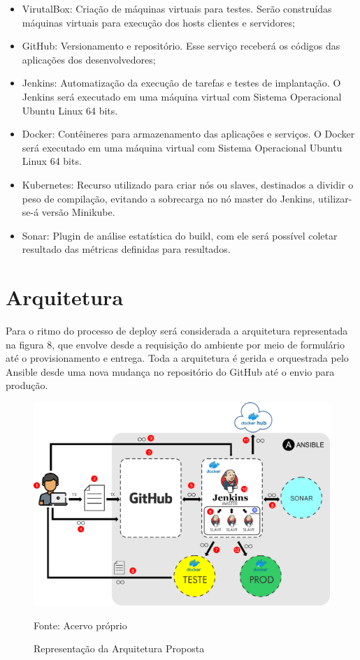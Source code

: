 \begin{itemize}
	    \vspace*{0.5cm}
	
\item VirutalBox: Criação de máquinas virtuais para testes. Serão construídas máquinas virtuais para execução dos hosts clientes e servidores;
\item GitHub: Versionamento e repositório. Esse serviço receberá os códigos das aplicações dos desenvolvedores;
\item Jenkins: Automatização da execução de tarefas e testes de implantação. O Jenkins será executado em uma máquina virtual com Sistema Operacional Ubuntu Linux 64 bits.
\item Docker: Contêineres para armazenamento das aplicações e serviços. O Docker será executado em uma máquina virtual com Sistema Operacional Ubuntu Linux 64 bits.
\item Kubernetes: Recurso utilizado para criar nós ou slaves, destinados a dividir o peso de compilação, evitando a sobrecarga no nó master do Jenkins, utilizar-se-á versão Minikube.
\item Sonar: Plugin de análise estatística do build, com ele será possível coletar resultado das métricas definidas para resultados.

\end{itemize}

    \vspace*{0.5cm}

\section{Arquitetura }

Para o ritmo do processo de deploy será considerada a arquitetura representada na figura 8, que envolve desde a requisição do ambiente por meio de formulário até o provisionamento e entrega.
Toda a arquitetura é gerida e orquestrada pelo Ansible desde uma nova mudança no repositório do GitHub até o envio para produção.
\\
\begin{figure}
	\centering
	\includegraphics[width=1\linewidth]{imagens/pipelinejenkins}
	\caption{Representação da Arquitetura Proposta}
Fonte: Acervo próprio
	\label{fig:pipelinejenkins}
\end{figure}

